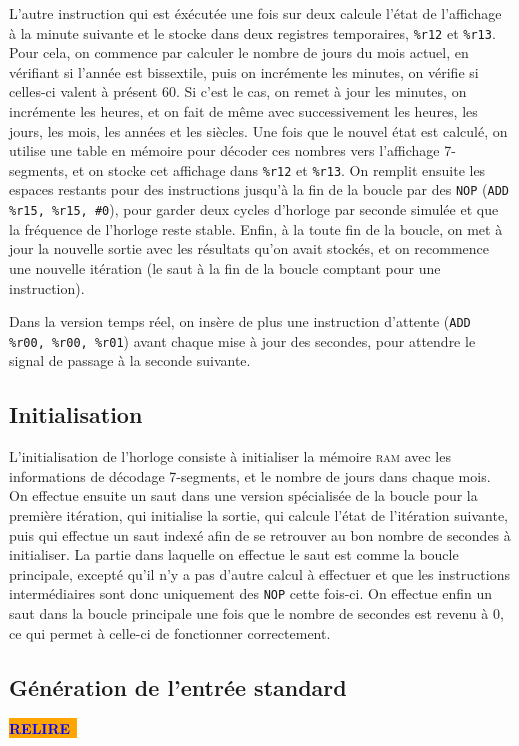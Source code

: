 \documentclass[11pt,a4paper]{article}
\newcommand{\relire}{\colorbox{orange}{\textcolor{blue}{\textbf{RELIRE}~}}}
\begin{document}
L'autre instruction qui est éxécutée une fois sur deux calcule l'état
de l'affichage à la minute suivante et le stocke dans deux registres
temporaires, \verb!%r12! et \verb!%r13!. Pour cela, on commence par
calculer le nombre de jours du mois actuel, en vérifiant si l'année
est bissextile, puis on incrémente les minutes, on vérifie si
celles-ci valent à présent 60. Si c'est le cas, on remet à jour les
minutes, on incrémente les heures, et on fait de même avec
successivement les heures, les jours, les mois, les années et les
siècles. Une fois que le nouvel état est calculé, on utilise une table
en mémoire pour décoder ces nombres vers l'affichage 7-segments, et on
stocke cet affichage dans \verb!%r12! et \verb!%r13!. On remplit
ensuite les espaces restants pour des instructions jusqu'à la fin de
la boucle par des \verb!NOP! (\verb!ADD %r15, %r15, #0!), pour garder
deux cycles d'horloge par seconde simulée et que la fréquence de
l'horloge reste stable. Enfin, à la toute fin de la boucle, on met à
jour la nouvelle sortie avec les résultats qu'on avait stockés, et on
recommence une nouvelle itération (le saut à la fin de la boucle
comptant pour une instruction).

Dans la version temps réel, on insère de plus une instruction
d'attente (\verb!ADD %r00, %r00, %r01!) avant chaque mise à jour des
secondes, pour attendre le signal de passage à la seconde suivante.

\subsection{Initialisation}

L'initialisation de l'horloge consiste à initialiser la mémoire
\textsc{ram} avec les informations de décodage 7-segments, et le
nombre de jours dans chaque mois. On effectue ensuite un saut dans une
version spécialisée de la boucle pour la première itération, qui
initialise la sortie, qui calcule l'état de l'itération suivante, puis
qui effectue un saut indexé afin de se retrouver au bon nombre de
secondes à initialiser. La partie dans laquelle on effectue le saut
est comme la boucle principale, excepté qu'il n'y a pas d'autre calcul
à effectuer et que les instructions intermédiaires sont donc
uniquement des \verb!NOP! cette fois-ci. On effectue enfin un saut
dans la boucle principale une fois que le nombre de secondes est
revenu à 0, ce qui permet à celle-ci de fonctionner correctement.

\subsection{Génération de l'entrée standard}
\relire
\end{document}
